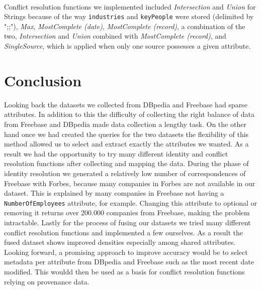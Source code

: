 \paragraph{}Conflict resolution functions we implemented included \textit{Intersection} and \textit{Union} for Strings because of the way \texttt{industries} and \texttt{keyPeople} were stored (delimited by ";;"), \textit{Max}, \textit{MostComplete (date)}, \textit{MostComplete (record)}, a combination of the two, \textit{Intersection} and \textit{Union} combined with \textit{MostComplete (record)}, and \textit{SingleSource}, which is applied when only one source possesses a given attribute.









\section{Conclusion}
Looking back the datasets we collected from DBpedia and Freebase had sparse attributes. In addition to this the difficulty of collecting the right balance of data from Freebase and DBpedia made data collection a lengthy task. On the other hand once we had created the queries for the two datasets the flexibility of this method allowed us to select and extract exactly the attributes we wanted. As a result we had the opportunity to try many different identity and conflict resolution functions after collecting and mapping the data. During the phase of identity resolution we generated a relatively low number of correspondences of Freebase with Forbes, because many companies in Forbes are not available in our dataset. This is explained by many companies in Freebase not having a \texttt{NumberOfEmployees} attribute, for example. Changing this attribute to optional or removing it returns over 200.000 companies from Freebase, making the problem intractable. Lastly for the process of fusing our datasets we tried many different conflict resolution functions and implemented a few ourselves. As a result the fused dataset shows improved densities especially among shared attributes. Looking forward, a promising approach to improve accuracy would be to select metadata per attribute from DBpedia and Freebase such as the most recent date modified. This wouldd then be used as a basis for conflict resolution functions relying on provenance data. 
















